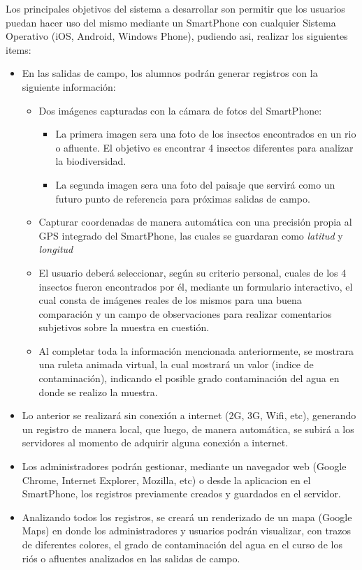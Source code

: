 Los principales objetivos del sistema a desarrollar son permitir que los usuarios puedan hacer uso del mismo mediante un SmartPhone con cualquier Sistema Operativo (iOS, Android, Windows Phone), pudiendo asi, realizar los siguientes items:
\begin{itemize}
    \item En las salidas de campo, los alumnos podrán generar registros con la siguiente información:
    \begin{itemize}
        \item Dos imágenes capturadas con la cámara de fotos del SmartPhone:
        \begin{itemize}
            \item La primera imagen sera una foto de los insectos encontrados en un rio o afluente. El objetivo es encontrar 4 insectos diferentes para analizar la biodiversidad.
            \item La segunda imagen sera una foto del paisaje que servirá como un futuro punto de referencia para próximas salidas de campo. 
        \end{itemize}
        \item Capturar coordenadas de manera automática con una precisión propia al GPS integrado del SmartPhone, las cuales se guardaran como \emph{latitud} y \emph{longitud}
        \item El usuario deberá seleccionar, según su criterio personal, cuales de los 4 insectos fueron encontrados por él, mediante un formulario interactivo, el cual consta de imágenes reales de los mismos para una buena comparación y un campo de observaciones para realizar comentarios subjetivos sobre la muestra en cuestión.
        \item Al completar toda la información mencionada anteriormente, se mostrara una ruleta animada virtual, la cual mostrará un valor (indice de contaminación), indicando el posible grado contaminación del agua en donde se realizo la muestra.
    \end{itemize}
    \item Lo anterior se realizará sin conexión a internet (2G, 3G, Wifi, etc), generando un registro de manera local, que luego, de manera automática, se subirá a los servidores al momento de adquirir alguna conexión a internet.
    \item Los administradores podrán gestionar, mediante un navegador web (Google Chrome, Internet Explorer, Mozilla, etc) o desde la aplicacion en el SmartPhone, los registros previamente creados y guardados en el servidor. 
    \item Analizando todos los registros, se creará un renderizado de un mapa  (Google Maps) en donde los administradores y usuarios podrán visualizar, con trazos de diferentes colores, el grado de contaminación del agua en el curso de los riós o afluentes analizados en las salidas de campo.
\end{itemize}
 


